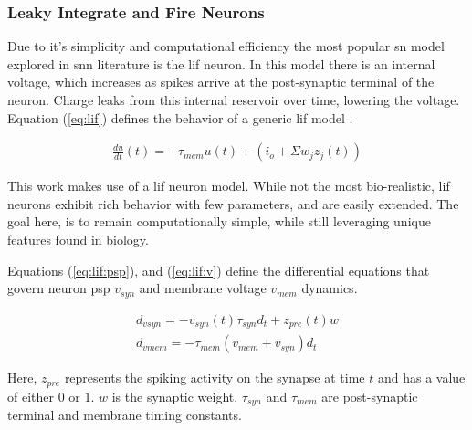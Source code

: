 \documentclass[conference]{IEEEtran}
\newcommand{\eq}[1]{Equation (\ref{#1})}
\begin{document}
\subsubsection{Leaky Integrate and Fire Neurons}
Due to it's simplicity and computational efficiency the most popular \gls{sn}
model explored in \gls{snn} literature is the \gls{lif} neuron. In this model
there is an internal voltage, which increases as spikes arrive at the
post-synaptic terminal of the neuron. Charge leaks from this internal reservoir
over time, lowering the voltage. \eq{eq:lif} defines the behavior of a generic
\gls{lif} model \parencite{izhikevich_2004}.

\begin{align}
  \frac{du}{dt}(t) = -\tau_{mem}u(t)+(i_o + \Sigma w_jz_j(t)) \label{eq:lif}
\end{align}



This work makes use of a \gls{lif} neuron model. While not the most
bio-realistic, \gls{lif} neurons exhibit rich behavior with few parameters, and
are easily extended. The goal here, is to remain computationally simple, while
still leveraging unique features found in biology.

Equations (\ref{eq:lif:psp}), and (\ref{eq:lif:v}) define the differential equations that
govern neuron \gls{psp} $v_{syn}$ and membrane voltage $v_{mem}$
dynamics.

\begin{align}
d_{vsyn} = -v_{syn}(t) \tau_{syn} d_t + z_{pre}(t) w \label{eq:lif:psp} \\
d_{vmem} = -\tau_{mem} (v_{mem} + v_{syn}) d_t \label{eq:lif:v}
\end{align}

Here, $z_{pre}$ represents the spiking activity on the synapse at time $t$ and
has a value of either $0$ or $1$. $w$ is the synaptic weight. $\tau_{syn}$ and
$\tau_{mem}$ are post-synaptic terminal and membrane timing constants.
\end{document}
